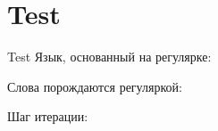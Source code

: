 \section{Test}
\begin{frame}{Test}
    Язык, основанный на регулярке:


    Слова порождаются регуляркой:

    Шаг итерации:


\end{frame}
